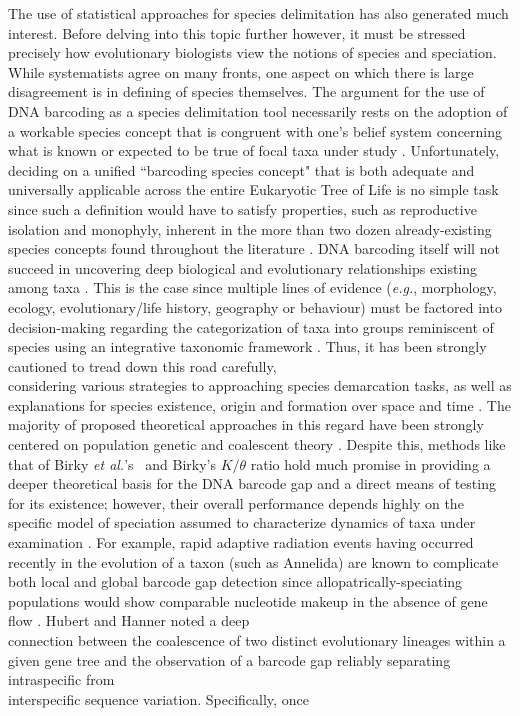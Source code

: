  

The use of statistical approaches for species delimitation has also generated much interest. Before delving into this topic further however, it must be stressed precisely how evolutionary biologists view the notions of species and speciation. While systematists agree on many fronts, one aspect on which there is large disagreement is in defining of species themselves. The argument for the use of DNA barcoding as a species delimitation tool necessarily rests on the adoption of a workable species concept that is congruent with one's belief system concerning what is known or expected to be true of focal taxa under study \cite{miller2007dna, pante2015species, will2005perils}. Unfortunately, deciding on a unified ``barcoding species concept" that is both adequate and universally applicable across the entire Eukaryotic Tree of Life is no simple task since such a definition would have to satisfy properties, such as reproductive isolation and monophyly, inherent in the more than two dozen already-existing species concepts found throughout the literature \cite{dequeiroz2007species}. DNA barcoding itself will not succeed in uncovering deep biological and evolutionary relationships existing among taxa \cite{will2005perils}. This is the case since multiple lines of evidence (\textit{e.g.}, morphology, ecology, evolutionary/life history, geography or behaviour) must be factored into decision-making regarding the categorization of taxa into groups reminiscent of species using an integrative taxonomic framework \cite{dayrat2005towards}. Thus, it has been strongly cautioned to tread down this road carefully, \\ considering various strategies to approaching species demarcation tasks, as well as \\ explanations for species existence, origin and formation over space and time \cite{carstens2013fail}. The majority of proposed theoretical approaches in this regard have been strongly centered on population genetic and coalescent theory \cite{kingman1982coalescent}. Despite this, methods like that of Birky \textit{et al.}'s~\cite{birky2010using} and Birky's \cite{birky2013species} $K/\theta$ ratio hold much promise in providing a deeper theoretical basis for the DNA barcode gap and a direct means of testing for its existence; however, their overall performance depends highly on the specific model of speciation assumed to characterize dynamics of taxa under examination \cite{fujisawa2013delimiting, kapli2017multirate, monaghan2009accelerated, pons2006sequence, puillandre2011abgd, zhang2013general}. For example, rapid adaptive radiation events having occurred recently in the evolution of a taxon (such as Annelida) are known to complicate both local and global barcode gap detection since allopatrically-speciating populations would show comparable nucleotide makeup in the absence of gene flow \cite{kvist2017does}. Hubert and Hanner \cite{hubert2015dna} noted a deep \\ connection between the coalescence of two distinct evolutionary lineages within a given gene tree and the observation of a barcode gap reliably separating intraspecific from \\ interspecific sequence variation. Specifically, once 